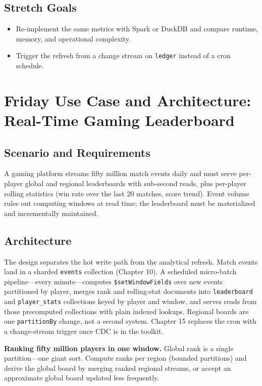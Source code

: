 \subsection*{Stretch Goals}
\begin{itemize}
    \item Re-implement the same metrics with Spark or DuckDB and compare runtime, memory, and operational complexity.
    \item Trigger the refresh from a change stream on \texttt{ledger} instead of a cron schedule.
\end{itemize}

\section{Friday Use Case and Architecture: Real-Time Gaming Leaderboard}
\subsection{Scenario and Requirements}
A gaming platform streams fifty million match events daily and must serve per-player global and regional leaderboards with sub-second reads, plus per-player rolling statistics (win rate over the last 20 matches, score trend). Event volume rules out computing windows at read time; the leaderboard must be materialized and incrementally maintained.

\subsection{Architecture}
The design separates the hot write path from the analytical refresh. Match events land in a sharded \texttt{events} collection (Chapter 10). A scheduled micro-batch pipeline---every minute---computes \texttt{\$setWindowFields} over new events partitioned by player, merges rank and rolling-stat documents into \texttt{leaderboard} and \texttt{player\_stats} collections keyed by player and window, and serves reads from those precomputed collections with plain indexed lookups. Regional boards are one \texttt{partitionBy} change, not a second system. Chapter 15 replaces the cron with a change-stream trigger once CDC is in the toolkit.

\begin{pitfall}
\textbf{Ranking fifty million players in one window.} Global rank is a single partition---one giant sort. Compute ranks per region (bounded partitions) and derive the global board by merging ranked regional streams, or accept an approximate global board updated less frequently.
\end{pitfall}

